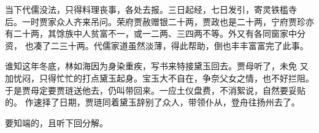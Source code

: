 当下代儒没法，只得料理丧事，各处去报。三日起经，七日发引，寄灵铁槛寺
后。一时贾家众人齐来吊问。荣府贾赦赠银二十两，贾政也是二十两，宁府贾珍亦
有二十两，其馀族中人贫富不一，或一二两、三四两不等。外又有各同窗家中分资，
也凑了二三十两。代儒家道虽然淡薄，得此帮助，倒也丰丰富富完了此事。

谁知这年冬底，林如海因为身染重疾，写书来特接黛玉回去。贾母听了，未免
又加忧闷，只得忙忙的打点黛玉起身。宝玉大不自在，争奈父女之情，也不好拦阻。
于是贾母定要贾琏送他去，仍叫带回来。一应土仪盘费，不消絮说，自然要妥贴的。
作速择了日期，贾琏同着黛玉辞别了众人，带领仆从，登舟往扬州去了。

要知端的，且听下回分解。